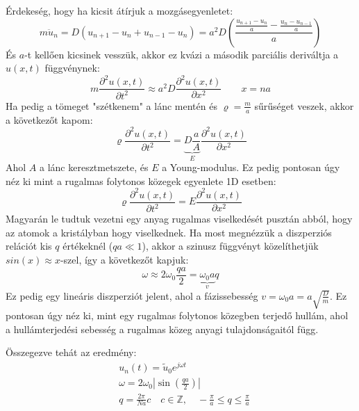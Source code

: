 \documentclass[../main.tex]{subfiles}
\begin{document}
Érdekeség, hogy ha kicsit átírjuk a mozgásegyenletet:
\begin{equation}
    m \ddot{u}_n = D(u_{n+1} - u_n + u_{n-1} - u_n) = a^2 D \left(\frac{\frac{u_{n+1} - u_n}{a} - \frac{u_n - u_{n-1}}{a}}{a}\right)
\end{equation}
És $a$-t kellően kicsinek vesszük, akkor ez kvázi a második parciális deriváltja a $u(x,t)$ függvénynek:
\begin{equation}
    m \frac{\partial^2 u(x,t)}{\partial t^2} \approx a^2 D \frac{\partial^2 u(x,t)}{\partial x^2} \qquad x = n a
\end{equation} 
Ha pedig a tömeget "szétkenem" a lánc mentén és $\varrho = \frac{m}{a}$ sűrűséget veszek, akkor a következőt kapom:
\begin{equation}
    \varrho \frac{\partial^2 u(x,t)}{\partial t^2} = \underbrace{D \frac{a}{A}}_E \frac{\partial^2 u(x,t)}{\partial x^2}
\end{equation}
Ahol $A$ a lánc keresztmetszete, és $E$ a Young-modulus. Ez pedig pontosan úgy néz ki mint a rugalmas folytonos közegek egyenlete 1D esetben:
\begin{equation}
    \varrho \frac{\partial^2 u(x,t)}{\partial t^2} = E \frac{\partial^2 u(x,t)}{\partial x^2}
\end{equation}
Magyarán le tudtuk vezetni egy anyag rugalmas viselkedését pusztán abból, hogy az atomok a kristályban hogy viselkednek. 
Ha most megnézzük a diszperziós relációt kis $q$ értékeknél ($q a \ll 1$), akkor a szinusz függvényt közelíthetjük $sin(x) \approx x$-szel, így a következőt kapjuk:
\begin{equation}
    \omega \approx 2 \omega_0 \frac{q a}{2} = \underbrace{\omega_0 a}_{v} q
\end{equation}
Ez pedig egy lineáris diszperziót jelent, ahol a fázissebesség $v = \omega_0 a = a \sqrt{\frac{D}{m}}$. Ez pontosan úgy néz ki, mint egy rugalmas folytonos közegben terjedő hullám, ahol a hullámterjedési sebesség
a rugalmas közeg anyagi tulajdonságaitól függ.

Összegezve tehát az eredmény:
\begin{equation}
    \boxed{
    \begin{aligned}
        &u_n(t) = \tilde{u}_0 e^{j \omega t} \\
        &\omega = 2 \omega_0 \left|\sin\left(\frac{q a}{2}\right)\right| \\
        &q = \frac{2 \pi}{N a} c \quad c \in \mathbb{Z}, \quad -\frac{\pi}{a} \leq q \leq \frac{\pi}{a}
    \end{aligned}
    }
\end{equation}
\end{document}

